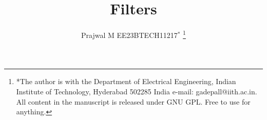 \documentclass[journal, 12pt, twocolumn]{IEEEtran}
\begin{document}

\def\putbox#1#2#3{\makebox[0in][l]{\makebox[#1][l]{}\raisebox{\baselineskip}[0in][0in]{\raisebox{#2}[0in][0in]{#3}}}}
\def\rightbox#1{\makebox[0in][r]{#1}}
\def\centbox#1{\makebox[0in]{#1}}
\def\topbox#1{\raisebox{-\baselineskip}[0in][0in]{#1}}
\def\midbox#1{\raisebox{-0.5\baselineskip}[0in][0in]{#1}}

\vspace{3cm}

\title{
	Filters
}


%
%
%

\author{Prajwal M EE23BTECH11217$^{*}$ %
	\thanks{*The author is with the Department
		of Electrical Engineering, Indian Institute of Technology, Hyderabad
		502285 India e-mail:  gadepall@iith.ac.in.  All content in the manuscript is
		released under GNU GPL.  Free to use for anything. }%
}
% 
%
\end{document}
